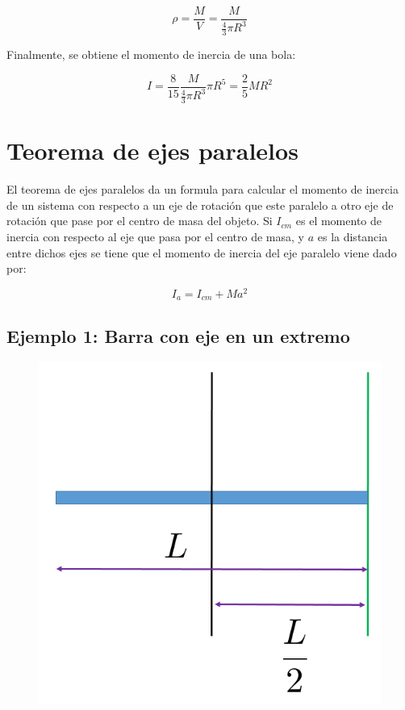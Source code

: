 \documentclass[a4paper,11pt]{article}
\begin{document}
$$ \rho = \frac{M}{V} = \frac{M}{\frac{4}{3} \pi R^3}$$

Finalmente, se obtiene el momento de inercia de una bola:

$$ I= \frac{8}{15} \frac{M}{\frac{4}{3} \pi R^3} \pi R^5 =  \frac{2}{5} M R^2$$

 

\section{Teorema de ejes paralelos}

El teorema de ejes paralelos da un formula para calcular el momento de inercia de un sistema con respecto a un eje de rotación que este paralelo a otro eje de rotación que pase por el centro de masa del objeto. Si $I_{cm}$ es el momento de inercia con respecto al eje que pasa por el centro de masa, y $a$ es la distancia entre dichos ejes se tiene que el momento de inercia del eje paralelo viene dado por:

\begin{equation}
 I_{a} = I_{cm} + M a^2
\end{equation}

\subsection{Ejemplo 1: Barra con eje en un extremo}

\begin{figure}
	\includegraphics[scale=0.5]{./im/paralelobarra}
\end{figure}
\end{document}

